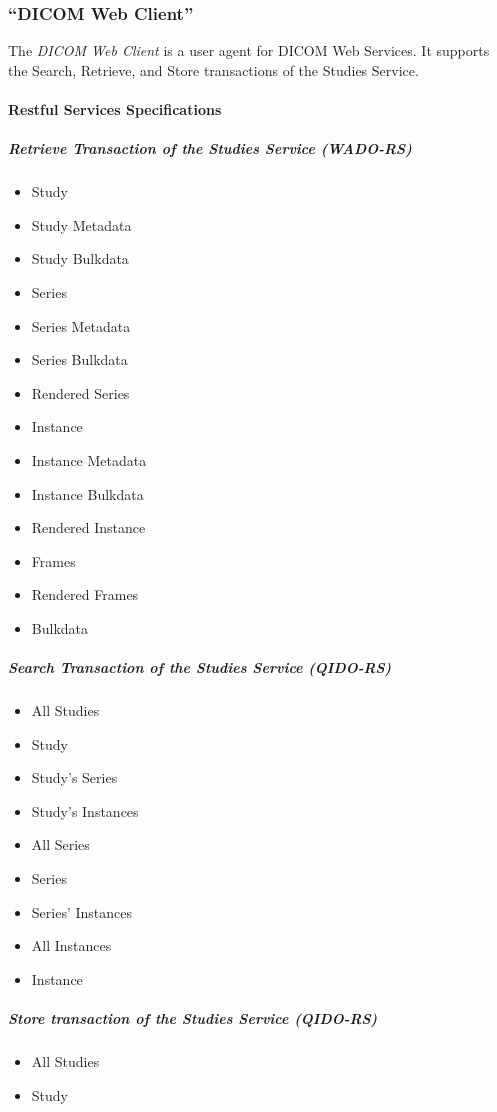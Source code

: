 \documentclass[12pt, letterpaper]{article}
\begin{document}
\subsubsection{``DICOM Web Client''}

The \emph{DICOM Web Client} is a user agent for DICOM Web Services.
It supports the Search, Retrieve, and Store transactions of the Studies Service.

\paragraph{Restful Services Specifications}

\subparagraph{Retrieve Transaction of the Studies Service (WADO-RS)}

\begin{itemize}
    \item Study
    \item Study Metadata
    \item Study Bulkdata
    \item Series
    \item Series Metadata
    \item Series Bulkdata
    \item Rendered Series
    \item Instance
    \item Instance Metadata
    \item Instance Bulkdata
    \item Rendered Instance
    \item Frames
    \item Rendered Frames
    \item Bulkdata
\end{itemize}

\subparagraph{Search Transaction of the Studies Service (QIDO-RS)}

\begin{itemize}
    \item All Studies
    \item Study
    \item Study's Series
    \item Study's Instances
    \item All Series
    \item Series
    \item Series' Instances
    \item All Instances
    \item Instance
\end{itemize}

\subparagraph{Store transaction of the Studies Service (QIDO-RS)}

\begin{itemize}
    \item All Studies
    \item Study
\end{itemize}
\end{document}
